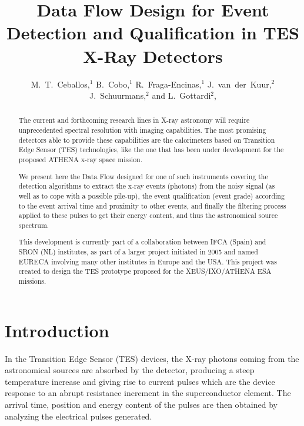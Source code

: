
\resetcounters




\title{Data Flow Design for Event Detection and Qualification 
in TES X-Ray Detectors}
\author{M.~T.~Ceballos,$^1$ B.~Cobo,$^1$ R.~Fraga-Encinas,$^1$ J.~van~der~Kuur,$^2$ J.~Schuurmans,$^2$ and L.~Gottardi$^2$,
}


\begin{abstract}
The current and forthcoming research lines in X-ray astronomy will require unprecedented spectral resolution with imaging capabilities. The most promising detectors able to provide these capabilities are the calorimeters based on Transition Edge Sensor (TES) technologies, like the one that has been under development for the proposed ATHENA x-ray space mission.

We present here the Data Flow designed for one of such instruments covering the detection algorithms to extract the x-ray events (photons) from the noisy signal (as well as to cope with a possible pile-up), the event qualification (event grade) according to the event arrival time and proximity to other events, and finally the filtering process applied to these pulses to get their energy content, and thus the astronomical source spectrum.

This development is currently part of a collaboration between IFCA (Spain) and SRON (NL) institutes, as part of a larger project initiated in 2005 and named EURECA \citep{deKorte_2009} involving many other institutes in Europe and the USA. This project was created to design the TES prototype proposed for the XEUS/IXO/ATHENA ESA missions.
\end{abstract}

\section{Introduction}

In the Transition Edge Sensor (TES) devices, the X-ray photons coming from the astronomical sources are absorbed by the detector, producing a steep temperature increase and giving rise to current pulses which are the device response to an abrupt resistance increment in the superconductor element. The arrival time, position and energy content of the pulses are then obtained by analyzing the electrical pulses generated.

